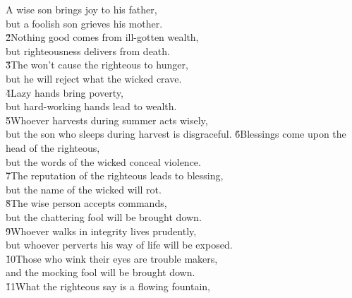 \begin{poetry}
\poeml A wise son brings joy to his father, \\
\poemll    but a foolish son grieves his mother. \\
\poeml \v{2}Nothing good comes from ill-gotten wealth, \\
\poemll    but righteousness delivers from death. \\
\poeml \v{3}The  won't cause the righteous to hunger, \\
\poemll    but he will reject what the wicked crave. \\
\poeml \v{4}Lazy hands bring poverty, \\
\poemll    but hard-working hands lead to wealth. \\
\poeml \v{5}Whoever harvests during summer acts wisely, \\
\poemll    but the son who sleeps during harvest is disgraceful.
\poeml \v{6}Blessings come upon the head of the righteous, \\
\poemll    but the words of the wicked conceal violence. \\
\poeml \v{7}The reputation of the righteous leads to blessing, \\
\poemll    but the name of the wicked will rot. \\
\poeml \v{8}The wise person accepts commands, \\
\poemll    but the chattering fool will be brought down. \\
\poeml \v{9}Whoever walks in integrity lives prudently, \\
\poemll    but whoever perverts his way of life will be exposed. \\
\poeml \v{10}Those who wink their eyes are trouble makers, \\
\poemll    and the mocking fool will be brought down. \\
\poeml \v{11}What the righteous say is a flowing fountain, \\

\end{poetry}
